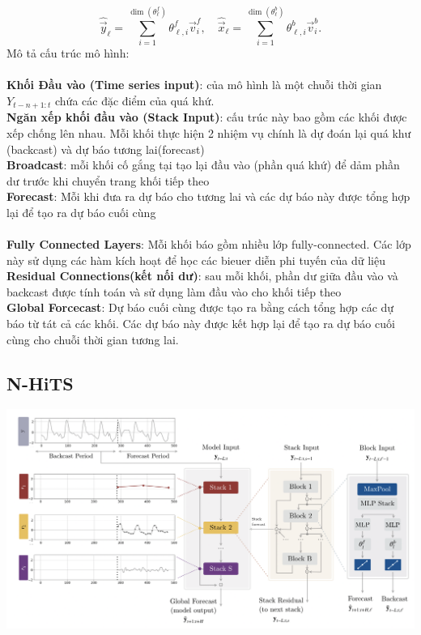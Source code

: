 \[\widehat{\vec{y}}_{\ell} = \sum_{i=1}^{\dim(\theta^f_{\ell})} \theta^f_{\ell,i} \vec{v}^f_{i}, \quad  \widehat{\vec{x}}_{\ell} = \sum_{i=1}^{\dim(\theta^b_{\ell})} \theta^b_{\ell,i} \vec{v}^b_{i}.
\]
Mô tả cấu trúc mô hình: \\
\\
\textbf{Khối Đầu vào (Time series input)}: của mô hình là một chuỗi thời gian \(Y_{t-n+1:t}\) chứa các đặc điểm của quá khứ.\\
\textbf{Ngăn xếp khối đầu vào (Stack Input)}: cấu trúc này bao gồm các khối được xếp chống lên nhau. Mỗi khối thực hiện 2 nhiệm vụ chính là dự đoán lại quá khư (backcast) và dự báo tương lai(forecast)\\
\textbf{Broadcast}: mỗi khối cố  gắng tại tạo lại đầu vào (phần quá khứ) để dảm phần dư trước khi chuyển trang khối tiếp theo\\
\textbf{Forecast}: Mỗi khi đưa ra dự báo cho tương lai và các dự báo này được tổng hợp lại để tạo ra dự báo cuối cùng\\
\\
\textbf{Fully Connected Layers}: Mỗi khối báo gồm nhiều lớp fully-connected. Các lớp này sử dụng các hàm kích hoạt để học các bieuer diễn phi tuyến của dữ liệu\\
\textbf{Residual Connections(kết nối dư)}: sau mỗi khối, phần dư giữa đầu vào và backcast được tính toán và sử dụng làm đầu vào cho khối tiếp theo\\
\textbf{Global Forcecast}: Dự báo cuối cùng được tạo ra bằng cách tổng hợp các dự báo từ tát cả các khối. Các dự báo này được kết hợp lại để tạo ra dự báo cuối cùng cho chuỗi thời gian tương lai.\\

\subsection{N-HiTS}
\begin{minipage}{0.45\textwidth}
\centering
\includegraphics[width=1\textwidth]{resources/chapter-4/nhits-1.png}
\end{minipage}


